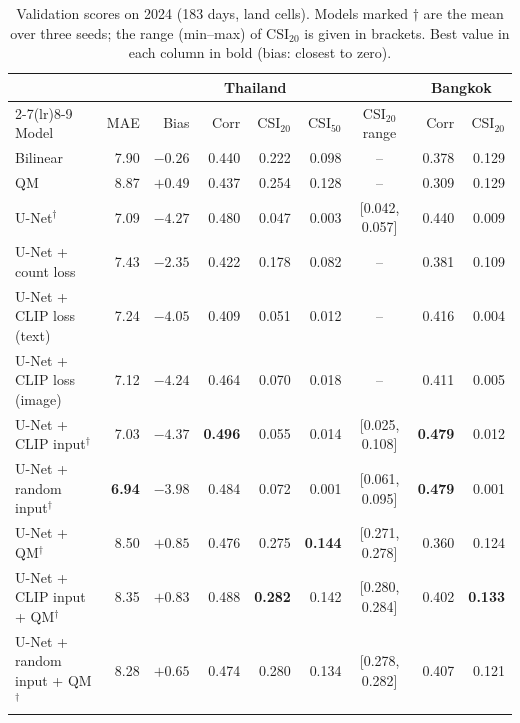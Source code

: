 \documentclass[sigconf]{acmart}
\begin{document}
\begin{table}
  \caption{Validation scores on 2024 (183 days, land cells). Models
  marked $\dagger$ are the mean over three seeds; the range (min--max) of
  CSI$_{20}$ is given in brackets. Best value in each column in bold
  (bias: closest to zero).}
  \label{tab:main}
  \small
  \begin{tabular}{lrrrrrcrr}
    \toprule
    & \multicolumn{6}{c}{Thailand} & \multicolumn{2}{c}{Bangkok} \\
    \cmidrule(lr){2-7}\cmidrule(lr){8-9}
    Model & MAE & Bias & Corr & CSI$_{20}$ & CSI$_{50}$ & CSI$_{20}$ range
      & Corr & CSI$_{20}$ \\
    \midrule
    Bilinear            & 7.90 & $\mathbf{-0.26}$ & 0.440 & 0.222 & 0.098 & -- & 0.378 & 0.129 \\
    QM                  & 8.87 & $+0.49$ & 0.437 & 0.254 & 0.128 & -- & 0.309 & 0.129 \\
    U-Net$^\dagger$     & 7.09 & $-4.27$ & 0.480 & 0.047 & 0.003 & [0.042, 0.057] & 0.440 & 0.009 \\
    U-Net + count loss  & 7.43 & $-2.35$ & 0.422 & 0.178 & 0.082 & -- & 0.381 & 0.109 \\
    U-Net + CLIP loss (text)  & 7.24 & $-4.05$ & 0.409 & 0.051 & 0.012 & -- & 0.416 & 0.004 \\
    U-Net + CLIP loss (image) & 7.12 & $-4.24$ & 0.464 & 0.070 & 0.018 & -- & 0.411 & 0.005 \\
    U-Net + CLIP input$^\dagger$  & 7.03 & $-4.37$ & \textbf{0.496} & 0.055 & 0.014 & [0.025, 0.108] & \textbf{0.479} & 0.012 \\
    U-Net + random input$^\dagger$ & \textbf{6.94} & $-3.98$ & 0.484 & 0.072 & 0.001 & [0.061, 0.095] & \textbf{0.479} & 0.001 \\
    \midrule
    U-Net + QM$^\dagger$              & 8.50 & $+0.85$ & 0.476 & 0.275 & \textbf{0.144} & [0.271, 0.278] & 0.360 & 0.124 \\
    U-Net + CLIP input + QM$^\dagger$ & 8.35 & $+0.83$ & 0.488 & \textbf{0.282} & 0.142 & [0.280, 0.284] & 0.402 & \textbf{0.133} \\
    U-Net + random input + QM$^\dagger$ & 8.28 & $+0.65$ & 0.474 & 0.280 & 0.134 & [0.278, 0.282] & 0.407 & 0.121 \\
    \bottomrule
  \end{tabular}
\end{table}
\end{document}
